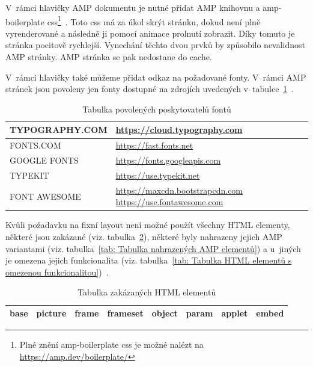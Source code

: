 V~rámci hlavičky AMP dokumentu je nutné přidat AMP knihovnu a amp-boilerplate css\footnote{Plné znění amp-boilerplate css je možné nalézt na \url{https://amp.dev/boilerplate/}}~\cite{AMPBoilerplate}. Toto css má za úkol skrýt stránku, dokud není plně vyrenderované a následně ji pomocí animace prolnutí zobrazit. Díky tomuto je stránka pocitově rychlejší.
Vynechání těchto dvou prvků by způsobilo nevalidnost AMP stránky. AMP stránka se pak nedostane do cache.

V~rámci hlavičky také můžeme přidat odkaz na požadované fonty. V~rámci AMP stránek jsou povoleny jen fonty dostupné na zdrojích uvedených v~tabulce~\ref{tab:Tabulka povolených zdrojů fontů}~\cite{ampCustomFonts}.

\begin{table}[H]
	\caption{Tabulka povolených poskytovatelů fontů}
	\centering
	\begin{tabular}{m{10em} | m{20em}}
		\toprule
		\cmidrule(r){1-2}
		TYPOGRAPHY.COM & \url{https://cloud.typography.com} \\ \midrule
		FONTS.COM & \url{https://fast.fonts.net} \\ \midrule
		GOOGLE FONTS & \url{https://fonts.googleapis.com} \\ \midrule
		TYPEKIT & \url{https://use.typekit.net} \\ \midrule
		FONT AWESOME & \url{https://maxcdn.bootstrapcdn.com} \newline \url{https://use.fontawesome.com} \\
		\bottomrule
	\end{tabular}
	\label{tab:Tabulka povolených zdrojů fontů}
\end{table}

Kvůli požadavku na fixní layout není možné použít všechny HTML elementy, některé jsou zakázané (viz. tabulka~\ref{tab: Tabulka zakázaných HTML elementů}), některé byly nahrazeny jejich AMP variantami (viz. tabulka~\ref{tab: Tabulka nahrazených AMP elementů}) a u~jiných je omezena jejich funkcionalita (viz. tabulka~\ref{tab: Tabulka HTML elementů s omezenou funkcionalitou})~\cite[p.\ 41]{AMP-ENG-Book}.

\begin{table}[H]
	\caption{Tabulka zakázaných HTML elementů} 
	\centering
	\begin{tabular}{c|c|c|c|c|c|c|c}
		\toprule
		base & picture & frame & frameset & object & param & applet & embed \\
		\bottomrule
	\end{tabular}
	\label{tab: Tabulka zakázaných HTML elementů}
\end{table}

